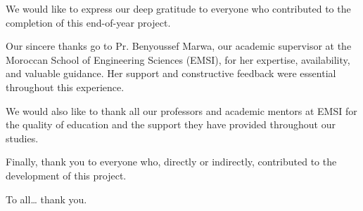 \setlength{\parskip}{1em}
We would like to express our deep gratitude to everyone who contributed to the completion of this end-of-year project.

Our sincere thanks go to Pr. Benyoussef Marwa, our academic supervisor at the Moroccan School of Engineering Sciences (EMSI), for her expertise, availability, and valuable guidance. Her support and constructive feedback were essential throughout this experience.

We would also like to thank all our professors and academic mentors at EMSI for the quality of education and the support they have provided throughout our studies.

Finally, thank you to everyone who, directly or indirectly, contributed to the development of this project.

To all… thank you.

